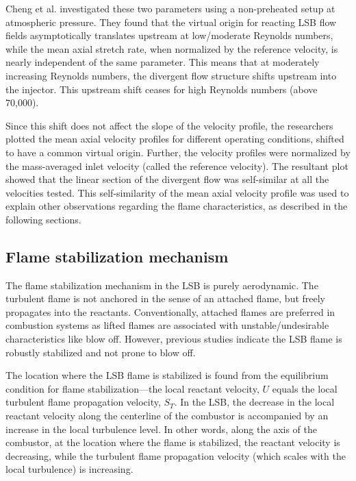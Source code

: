 Cheng et al.\cite{2006-cheng,2008-cheng-a} investigated these two parameters using a non-preheated setup at atmospheric pressure.
They found that the virtual origin for reacting LSB flow fields asymptotically translates upstream at low/moderate Reynolds numbers, while the mean axial stretch rate, when normalized by the reference velocity, is nearly independent of the same parameter.
This means that at moderately increasing Reynolds numbers, the divergent flow structure shifts upstream into the injector.
This upstream shift ceases for high Reynolds numbers (above 70,000).

Since this shift does not affect the slope of the velocity profile, the researchers plotted the mean axial velocity profiles for different operating conditions, shifted to have a common virtual origin.
Further, the velocity profiles were normalized by the mass-averaged inlet velocity (called the reference velocity).
The resultant plot showed that the linear section of the divergent flow was self-similar at all the velocities tested.
This self-similarity of the mean axial velocity profile was used to explain other observations regarding the flame characteristics, as described in the following sections.

\subsection{Flame stabilization mechanism}
\label{subsec:lsb-flame-stabilization-mechanism}



The flame stabilization mechanism in the LSB is purely aerodynamic.
The turbulent flame is not anchored in the sense of an attached flame, but freely propagates into the reactants.
Conventionally, attached flames are preferred in combustion systems as lifted flames are associated with unstable/undesirable characteristics like blow off.
However, previous studies\cite{2005-johnson} indicate the LSB flame is robustly stabilized and not prone to blow off.

The location where the LSB flame is stabilized is found from the equilibrium condition for flame stabilization---the local reactant velocity, \(U\) equals the local turbulent flame propagation velocity, \(S_T\).
In the LSB, the decrease in the local reactant velocity along the centerline of the combustor is accompanied by an increase in the local turbulence level.
In other words, along the axis of the combustor, at the location where the flame is stabilized, the reactant velocity is decreasing, while the turbulent flame propagation velocity (which scales with the local turbulence) is increasing.

